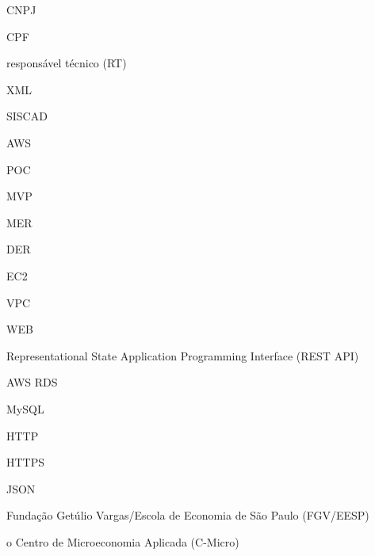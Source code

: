 CNPJ

CPF

responsável técnico (RT)

XML

SISCAD

AWS

POC

MVP

MER

DER

EC2

VPC

WEB


Representational State Application Programming Interface (REST API)


AWS RDS

MySQL

HTTP

HTTPS

JSON

Fundação Getúlio Vargas/Escola de Economia de São Paulo (FGV/EESP)

o Centro de Microeconomia Aplicada (C-Micro)

